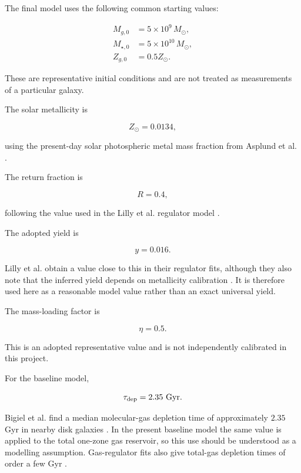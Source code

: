 \documentclass[10pt,a4paper]{article}
\begin{document}
The final model uses the following common starting values:

\begin{align}
M_{g,0} &= 5\times10^9\,M_\odot,\\
M_{\star,0} &= 5\times10^{10}\,M_\odot,\\
Z_{g,0} &= 0.5Z_\odot.
\end{align}

These are representative initial conditions and are not treated as measurements of a particular galaxy.

The solar metallicity is

\begin{equation}
Z_\odot=0.0134,
\end{equation}

using the present-day solar photospheric metal mass fraction from Asplund et al. \cite{asplund2009}.

The return fraction is

\begin{equation}
R=0.4,
\end{equation}

following the value used in the Lilly et al. regulator model \cite{lilly2013}.

The adopted yield is

\begin{equation}
y=0.016.
\end{equation}

Lilly et al. obtain a value close to this in their regulator fits, although they also note that the inferred yield depends on metallicity calibration \cite{lilly2013}. It is therefore used here as a reasonable model value rather than an exact universal yield.

The mass-loading factor is

\begin{equation}
\eta=0.5.
\end{equation}

This is an adopted representative value and is not independently calibrated in this project.

For the baseline model,

\begin{equation}
\tau_{\rm dep}=2.35~{\rm Gyr}.
\end{equation}

Bigiel et al. find a median molecular-gas depletion time of approximately \(2.35\) Gyr in nearby disk galaxies \cite{bigiel2011}. In the present baseline model the same value is applied to the total one-zone gas reservoir, so this use should be understood as a modelling assumption. Gas-regulator fits also give total-gas depletion times of order a few Gyr \cite{lilly2013}.
\end{document}
